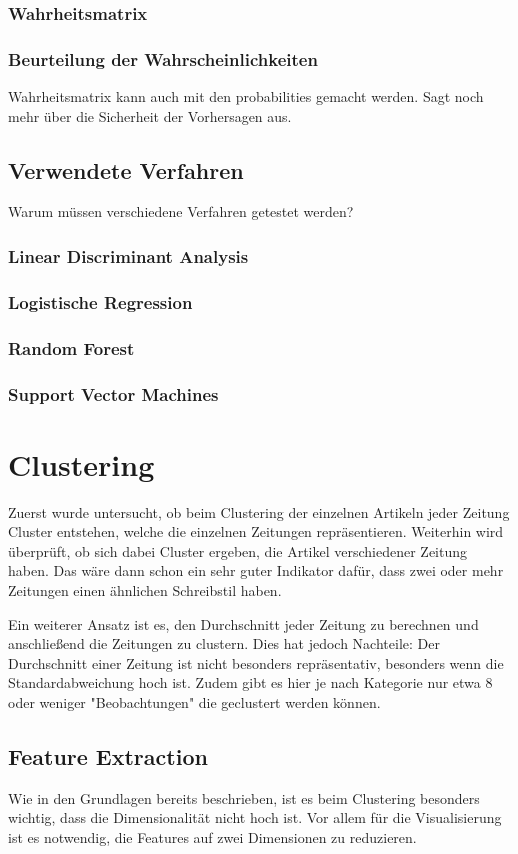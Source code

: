 \subsubsection*{Wahrheitsmatrix}
\subsubsection*{Beurteilung der Wahrscheinlichkeiten}
Wahrheitsmatrix kann auch mit den probabilities gemacht werden. Sagt noch mehr über die Sicherheit der Vorhersagen aus.
\subsection{Verwendete Verfahren}
Warum müssen verschiedene Verfahren getestet werden?
\subsubsection*{Linear Discriminant Analysis}
\subsubsection*{Logistische Regression}
\subsubsection*{Random Forest}
\subsubsection*{Support Vector Machines}
\section{Clustering}
Zuerst wurde untersucht, ob beim Clustering der einzelnen Artikeln jeder Zeitung Cluster entstehen, welche die einzelnen Zeitungen repräsentieren. Weiterhin wird überprüft, ob sich dabei Cluster ergeben, die Artikel verschiedener Zeitung haben. Das wäre dann schon ein sehr guter Indikator dafür, dass zwei oder mehr Zeitungen einen ähnlichen Schreibstil haben.

Ein weiterer Ansatz ist es, den Durchschnitt jeder Zeitung zu berechnen und anschließend die Zeitungen zu clustern. Dies hat jedoch Nachteile: Der Durchschnitt einer Zeitung ist nicht besonders repräsentativ, besonders wenn die Standardabweichung hoch ist. Zudem gibt es hier je nach Kategorie nur etwa 8 oder weniger "Beobachtungen" die geclustert werden können.
\subsection{Feature Extraction}
Wie in den Grundlagen bereits beschrieben, ist es beim Clustering besonders wichtig, dass die Dimensionalität nicht hoch ist. Vor allem für die Visualisierung ist es notwendig, die Features auf zwei Dimensionen zu reduzieren.
